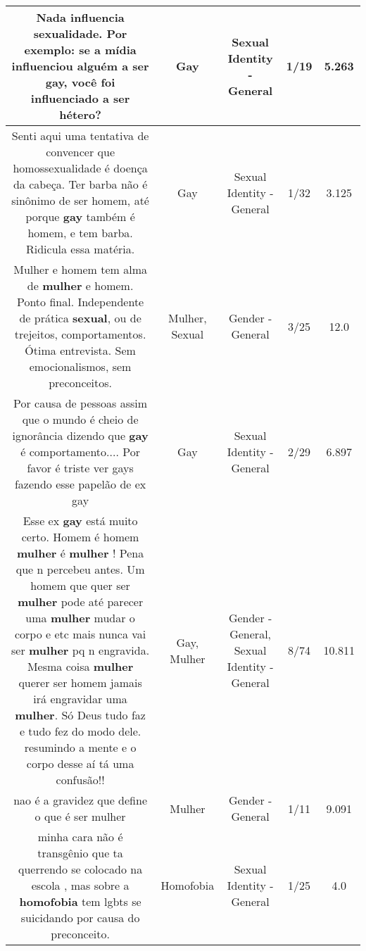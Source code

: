 \documentclass[11pt]{article}
\newlength\mylength
\begin{document}
\begin{center}
\begin{longtable}{|C{.65\mylength}|C{.30\mylength}|C{.12\mylength}|C{.12\mylength}|C{.12\mylength}|}
  \small Nada influencia sexualidade. Por exemplo: se a mídia influenciou alguém a ser \textbf{gay}, você foi influenciado a ser hétero?\normalsize   & Gay & Sexual Identity - General & 1/19 & 5.263 \\  \hline
  \small Senti aqui uma tentativa de convencer que homossexualidade é doença da cabeça. Ter barba não é sinônimo de ser homem, até porque \textbf{gay} também é homem, e tem barba. Ridicula essa matéria.\normalsize   & Gay & Sexual Identity - General & 1/32 & 3.125 \\  \hline
  \small Mulher e homem tem alma de \textbf{mulher} e homem. Ponto final. Independente de prática \textbf{sexual}, ou de trejeitos, comportamentos. Ótima entrevista. Sem emocionalismos, sem preconceitos.\normalsize   & Mulher, Sexual & Gender - General & 3/25 & 12.0 \\  \hline
  \small Por causa de pessoas assim que o mundo é cheio de ignorância dizendo que \textbf{gay} é comportamento.... Por favor é triste ver gays fazendo esse papelão de ex gay\normalsize   & Gay & Sexual Identity - General & 2/29 & 6.897 \\  \hline
  \small Esse ex \textbf{gay} está muito certo. Homem é homem \textbf{mulher} é \textbf{mulher} ! Pena que n percebeu antes. Um homem que quer ser \textbf{mulher} pode até parecer uma \textbf{mulher} mudar o corpo e etc mais nunca vai ser \textbf{mulher} pq n engravida. Mesma coisa \textbf{mulher} querer ser homem jamais irá engravidar uma \textbf{mulher}. Só Deus tudo faz e tudo fez do modo dele. resumindo a mente e o corpo desse aí tá uma confusão!!\normalsize   & Gay, Mulher & Gender - General, Sexual Identity - General & 8/74 & 10.811 \\  \hline
  \small nao é a gravidez que define o que é ser mulher\normalsize   & Mulher & Gender - General & 1/11 & 9.091 \\  \hline
  \small minha cara não é transgênio que ta querrendo se colocado na escola , mas sobre a \textbf{homofobia} tem lgbts se suicidando por causa do preconceito.\normalsize   & Homofobia & Sexual Identity - General & 1/25 & 4.0 \\  \hline

\end{longtable}
\end{center}
\end{document}
